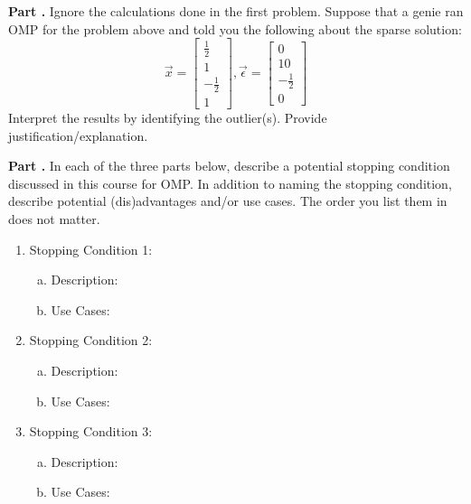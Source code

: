 \documentclass[11pt,letterpaper]{article}
\newcounter{problem}
\newcommand{\problem}{
	\stepcounter{problem}%
	\noindent \textbf{Part \theproblem. }%
}
\begin{document}
\newpage
\problem Ignore the calculations done in the first problem. Suppose that a genie ran OMP for the problem above and told you the following about the sparse solution: %
\begin{equation*}
    \vec{x} = \begin{bmatrix}
        \frac{1}{2} \\ 1 \\ -\frac{1}{2} \\ 1
    \end{bmatrix}, \vec{\epsilon} = \begin{bmatrix}
        0 \\ 10 \\ -\frac{1}{2} \\ 0
    \end{bmatrix}
\end{equation*}
Interpret the results by identifying the outlier(s). Provide justification/explanation.
\vspace{5cm}


\problem In each of the three parts below, describe a potential stopping condition discussed in this course for OMP. In addition to naming the stopping condition, describe potential (dis)advantages and/or use cases. The order you list them in does not matter.
	\begin{enumerate}
	\item Stopping Condition 1: 
	    \begin{enumerate}[(a)]
	        \item Description:\vspace{1cm}
	        \item Use Cases: \vspace{1cm}
	    \end{enumerate}
	\item Stopping Condition 2: 
	    \begin{enumerate}[(a)]
	        \item Description: \vspace{1cm}
	        \item Use Cases:\vspace{1cm}
	    \end{enumerate}
	\item Stopping Condition 3: 
	    \begin{enumerate}[(a)]
	        \item Description:\vspace{1cm}
	        \item Use Cases:\vspace{1cm}
	    \end{enumerate}
	\end{enumerate} \vspace{6cm}
\end{document}
